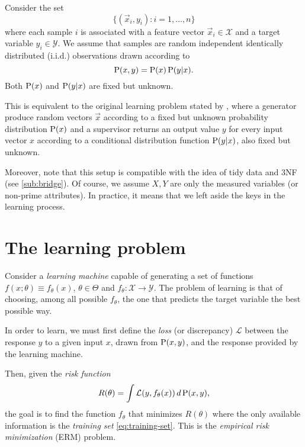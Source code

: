 Consider the set
\begin{equation}
  \label{eq:training-set}
  \big\{(\vec{x}_i, y_i) : i = 1, \dots, n \big\}
\end{equation}
where each sample $i$ is associated with a feature vector $\vec{x}_i \in \mathcal{X}$ and a target variable
$y_i \in \mathcal{Y}$.  We assume that samples are random independent identically
distributed (i.i.d.) observations drawn according to $$\operatorname{P}(x, y) = \operatorname{P}(x) \operatorname{P}(y | x)\text{.}$$
Both $\operatorname{P}(x)$ and $\operatorname{P}(y|x)$ are fixed but unknown.

This is equivalent to the original learning problem stated by \textcite{Vapnik1999b}, where
a generator produce random vectors $\vec{x}$ according to a fixed but unknown
probability distribution $\operatorname{P}(x)$ and a supervisor returns an output value $y$ for every
input vector $x$ according to a conditional distribution function $\operatorname{P}(y|x)$, also fixed but
unknown.

Moreover, note that this setup is compatible with the idea of tidy data and 3NF (see
\cref{sub:bridge}). Of course, we assume $X, Y$ are only the measured variables (or
non-prime attributes).  In practice, it means that we left aside the keys in the learning
process.

\section{The learning problem}

Consider a \emph{learning machine} capable of generating a set of functions $f(x;
\theta) \equiv f_\theta(x)$, $\theta \in \Theta$ and $f_\theta : \mathcal{X} \rightarrow \mathcal{Y}$.
The problem of learning is that of choosing, among all possible $f_\theta$, the one that
predicts the target variable the best possible way.

In order to learn, we must first define the \emph{loss} (or discrepancy) $\mathcal{L}$
between the response $y$ to a given input $x$, drawn from $\operatorname{P}(x, y)$, and the
response provided by the learning machine.

Then, given the \emph{risk function}
\begin{equation}
  \label{eq:risk}
  R(\theta) = \int \mathcal{L}(y, f_\theta(x))\, d\operatorname{P}(x, y)\text{,}
\end{equation}
the goal is to find the function $f_\theta$ that minimizes $R(\theta)$
where the only available information is the \emph{training set} \eqref{eq:training-set}.
This is the \emph{empirical risk minimization} (ERM) problem.

